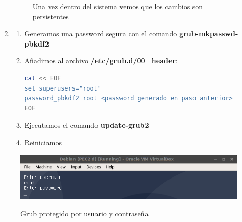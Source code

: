 \documentclass[10pt,a4paper]{article}
\begin{document}
\begin{enumerate}[label=\textbf{\alph*)}]
\begin{figure}[h!]
  \caption{Una vez dentro del sistema vemos que los cambios son persistentes}
  \label{fig:grub5}
\end{figure}
\item 
\pagebreak
\begin{enumerate}[label=\arabic*.]
\item Generamos una password segura con el comando \textbf{grub-mkpasswd-pbkdf2}
\item Añadimos al archivo \textbf{/etc/grub.d/00\_header}:
\begin{lstlisting}[language=bash]
cat << EOF
set superusers="root"
password_pbkdf2 root <password generado en paso anterior>
EOF
\end{lstlisting}
\item Ejecutamos el comando \textbf{update-grub2}
\item Reiniciamos

\end{enumerate}

\end{enumerate}

\begin{figure}[h!]
  \centering
  \includegraphics[scale=0.6]{e.png}\\
  \caption{Grub protegido por usuario y contraseña \cite{grub}}
  \label{fig:grub}
\end{figure}
\end{document}
